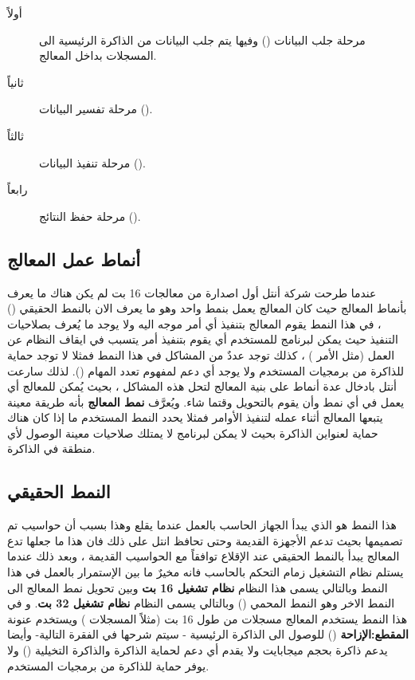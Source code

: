 \documentclass[document.tex]{subfiles}
\begin{document}
\begin{description}
\item [أولاً] مرحلة جلب البيانات () وفيها يتم جلب البيانات من الذاكرة الرئيسية الى المسجلات بداخل المعالج.
\item [ثانياً] مرحلة تفسير البيانات ().
\item [ثالثاً] مرحلة تنفيذ البيانات ().
\item [رابعاً] مرحلة حفظ النتائج ().
\end{description}

\subsection{أنماط عمل المعالج }
عندما طرحت شركة أنتل أول اصدارة من معالجات 16 بت لم يكن هناك ما يعرف بأنماط المعالج حيث كان المعالج يعمل بنمط واحد وهو ما يعرف الان بالنمط الحقيقي () ، في هذا النمط يقوم المعالج بتنفيذ أي أمر موجه اليه ولا يوجد ما يُعرف بصلاحيات التنفيذ حيث يمكن لبرنامج للمستخدم أي يقوم بتنفيذ أمر يتسبب في ايقاف النظام عن العمل (مثل الأمر ) ، كذلك توجد عددٌ من المشاكل في هذا النمط فمثلا لا توجد حماية للذاكرة من برمجيات المستخدم ولا يوجد أي دعم لمفهوم تعدد المهام (). لذلك سارعت أنتل بادخال عدة أنماط على بنية المعالج لتحل هذه المشاكل ، بحيث يُمكن للمعالج أي يعمل في أي نمط وأن يقوم بالتحويل وقتما شاء. ويُعرَّف \textbf{نمط المعالج} بأنه طريقة معينة يتبعها المعالج أثناء عمله لتنفيذ الأوامر فمثلا يحدد النمط المستخدم ما إذا كان هناك حماية لعنواين الذاكرة بحيث لا يمكن لبرنامج لا يمتلك صلاحيات معينة الوصول لأي منطقة في الذاكرة. 

\subsection{النمط الحقيقي }
هذا النمط هو الذي يبدأ الجهاز الحاسب بالعمل عندما يقلع وهذا بسبب أن حواسيب  تم تصميمها بحيث تدعم الأجهزة القديمة وحتى تحافظ انتل على ذلك فان هذا ما جعلها تدع المعالج يبدأ بالنمط الحقيقي عند الإقلاع توافقاً مع الحواسيب القديمة ، وبعد ذلك عندما يستلم نظام التشغيل زمام التحكم بالحاسب فانه مخيرٌ ما بين الإستمرار بالعمل في هذا النمط وبالتالي يسمى هذا النظام \textbf{نظام تشغيل 16 بت} وبين تحويل نمط المعالج الى النمط الاخر وهو النمط المحمي () وبالتالي يسمى النظام \textbf{نظام تشغيل 32 بت}.
و في هذا النمط يستخدم المعالج مسجلات من طول 16 بت (مثلاً المسجلات ) ويستخدم عنونة \textbf{المقطع:الإزاحة} () للوصول الى الذاكرة الرئيسية - سيتم شرحها في الفقرة التالية- وأيضا يدعم ذاكرة بحجم  ميجابايت ولا يقدم أي دعم لحماية الذاكرة والذاكرة التخيلية () ولا يوفر حماية للذاكرة من برمجيات المستخدم.
\end{document}
